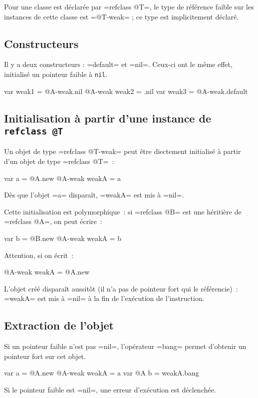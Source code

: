 Pour une classe est déclarée par \ggs=refclass @T=, le type de référence faible sur les instances de cette classe est \ggs=@T-weak= ; ce type est implicitement déclaré.







\subsection{Constructeurs}

Il y a deux constructeurs : \ggs=default= et \ggs=nil=. Ceux-ci ont le même effet, initialisé un pointeur faible à \texttt{nil}.

\begin{galgas}
  var weak1 = @A-weak.nil
  @A-weak weak2 = .nil
  var weak3 = @A-weak.default
\end{galgas}


\subsection{Initialisation à partir d'une instance de \texttt{refclass @T}}

Un objet de type \ggs=refclass @T-weak= peut être diectement initialisé à partir d'un objet de type \ggs=refclass @T=~:
\begin{galgas}
  var a = @A.new
  @A-weak weakA = a
\end{galgas}

Dès que l'objet \ggs=a= disparaît, \ggs=weakA= est mis à \ggs=nil=.

Cette initialisation est polymorphique~: si \ggs=refclass @B= est une héritière de \ggs=refclass @A=, on peut écrire~:
\begin{galgas}
  var b = @B.new
  @A-weak weakA = b
\end{galgas}

Attention, si on écrit~:
\begin{galgas}
  @A-weak weakA = @A.new
\end{galgas}
L'objet créé disparaît aussitôt (il n'a pas de pointeur fort qui le référencie)~: \ggs=weakA= est mis à \ggs=nil= à la fin de l'exécution de l'instruction.


\subsection{Extraction de l'objet}

Si un pointeur faible n'est pas \ggs=nil=, l'opérateur \ggs=bang= permet d'obtenir un pointeur fort sur cet objet.
\begin{galgas}
  var a = @A.new
  @A-weak weakA = a
  var @A b = weakA.bang
\end{galgas}
Si le pointeur faible est \ggs=nil=, une erreur d'exécution est déclenchée.



